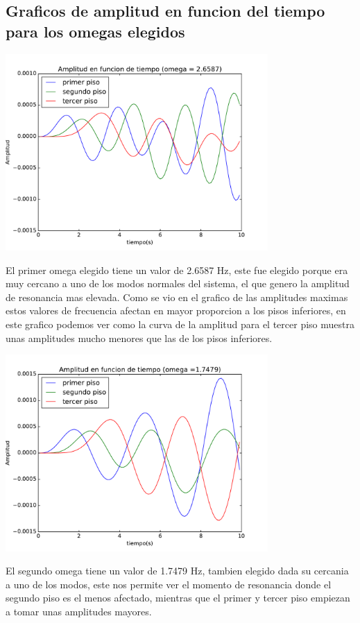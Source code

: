 \documentclass[11pt,letterpaper]{exam}
\begin{document}
\subsection{Graficos de amplitud en funcion del tiempo para los omegas elegidos}
\begin{center}
\includegraphics[width=10cm]{avst_o1.pdf} 
\end{center}  

El primer omega elegido tiene un valor de 2.6587 Hz, este fue elegido porque era muy cercano a uno de los modos normales del sistema, el que genero la amplitud de resonancia mas elevada. Como se vio en el grafico de las amplitudes maximas estos valores de frecuencia afectan en mayor proporcion a los pisos inferiores, en este grafico podemos ver como la curva de la amplitud para el tercer piso muestra unas amplitudes mucho menores que las de los pisos inferiores.
 

\begin{center}
\includegraphics[width=10cm]{avst_o2.pdf} 
\end{center} 

El segundo omega tiene un valor de 1.7479 Hz, tambien elegido dada su cercania a uno de los modos, este nos permite ver el momento de resonancia donde el segundo piso es el menos afectado, mientras que el primer y tercer piso empiezan a tomar unas amplitudes mayores. 
\end{document}
